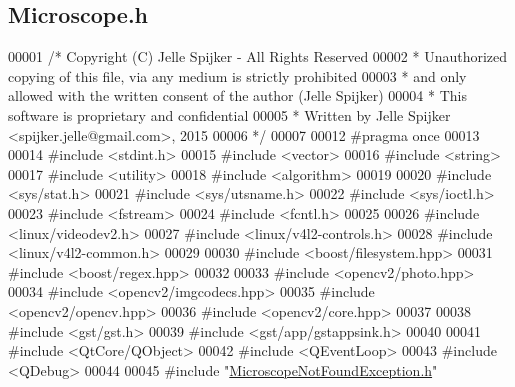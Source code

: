 \hypertarget{_microscope_8h_source}{}\subsection{Microscope.\+h}
\label{_microscope_8h_source}

\begin{DoxyCode}
00001 \textcolor{comment}{/* Copyright (C) Jelle Spijker - All Rights Reserved}
00002 \textcolor{comment}{ * Unauthorized copying of this file, via any medium is strictly prohibited}
00003 \textcolor{comment}{ * and only allowed with the written consent of the author (Jelle Spijker)}
00004 \textcolor{comment}{ * This software is proprietary and confidential}
00005 \textcolor{comment}{ * Written by Jelle Spijker <spijker.jelle@gmail.com>, 2015}
00006 \textcolor{comment}{ */}
00007 
00012 \textcolor{preprocessor}{#pragma once}
00013 
00014 \textcolor{preprocessor}{#include <stdint.h>}
00015 \textcolor{preprocessor}{#include <vector>}
00016 \textcolor{preprocessor}{#include <string>}
00017 \textcolor{preprocessor}{#include <utility>}
00018 \textcolor{preprocessor}{#include <algorithm>}
00019 
00020 \textcolor{preprocessor}{#include <sys/stat.h>}
00021 \textcolor{preprocessor}{#include <sys/utsname.h>}
00022 \textcolor{preprocessor}{#include <sys/ioctl.h>}
00023 \textcolor{preprocessor}{#include <fstream>}
00024 \textcolor{preprocessor}{#include <fcntl.h>}
00025 
00026 \textcolor{preprocessor}{#include <linux/videodev2.h>}
00027 \textcolor{preprocessor}{#include <linux/v4l2-controls.h>}
00028 \textcolor{preprocessor}{#include <linux/v4l2-common.h>}
00029 
00030 \textcolor{preprocessor}{#include <boost/filesystem.hpp>}
00031 \textcolor{preprocessor}{#include <boost/regex.hpp>}
00032 
00033 \textcolor{preprocessor}{#include <opencv2/photo.hpp>}
00034 \textcolor{preprocessor}{#include <opencv2/imgcodecs.hpp>}
00035 \textcolor{preprocessor}{#include <opencv2/opencv.hpp>}
00036 \textcolor{preprocessor}{#include <opencv2/core.hpp>}
00037 
00038 \textcolor{preprocessor}{#include <gst/gst.h>}
00039 \textcolor{preprocessor}{#include <gst/app/gstappsink.h>}
00040 
00041 \textcolor{preprocessor}{#include <QtCore/QObject>}
00042 \textcolor{preprocessor}{#include <QEventLoop>}
00043 \textcolor{preprocessor}{#include <QDebug>}
00044 
00045 \textcolor{preprocessor}{#include "\hyperlink{_microscope_not_found_exception_8h}{MicroscopeNotFoundException.h}"}

\end{DoxyCode}
